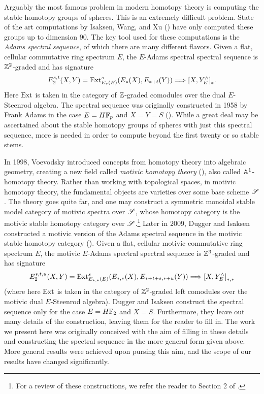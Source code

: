 \documentclass[../main.tex]{subfiles}
\begin{document}
Arguably the most famous problem in modern homotopy theory is computing the stable homotopy groups of spheres. This is an extremely difficult problem. State of the art computations by Isaksen, Wang, and Xu (\cite{isaksen2023stable}) have only computed these groups up to dimension $90$. The key tool used for these computations is the \emph{Adams spectral sequence}, of which there are many different flavors. Given a flat, cellular commutative ring spectrum $E$, the $E$-Adams spectral spectral sequence is $\mathbb{Z}^2$-graded and has signature
\[E_2^{s,t}(X,Y)=\mathrm{Ext}_{E_*(E)}^{s}(E_*(X),E_{*+t}(Y))\Longrightarrow {[X,Y_E^\wedge]}_*.\]
Here $\mathrm{Ext}$ is taken in the category of $\mathbb{Z}$-graded comodules over the dual $E$-Steenrod algebra. The spectral sequence was originally constructed in 1958 by Frank Adams in the case $E=H\mathbb{F}_p$ and $X=Y=S$ (\cite{Adams1958}). While a great deal may be ascertained about the stable homotopy groups of spheres with just this spectral sequence, more is needed in order to compute beyond the first twenty or so stable stems.

In 1998, Voevodsky introduced concepts from homotopy theory into algebraic geometry, creating a new field called \emph{motivic homotopy theory} (\cite{voevodsky1998a1}), also called $\mathbb A^1$-homotopy theory. Rather than working with topological spaces, in motivic homotopy theory, the fundamental objects are varieties over some base scheme $\mathscr{S}$. The theory goes quite far, and one may construct a symmetric monoidal stable model category of motivic spectra over $\mathscr{S}$, whose homotopy category is the motivic stable homotopy category over $\mathscr{S}$.\footnote{For a review of these constructions, we refer the reader to Section 2 of \cite{WilOst}.} Later in 2009, Dugger and Isaksen constructed a motivic version of the Adams spectral sequence in the motivic stable homotopy category (\cite{DugIsak}). Given a flat, cellular motivic commutative ring spectrum $E$, the motivic $E$-Adams spectral spectral sequence is $\mathbb{Z}^3$-graded and has signature
\[E_2^{s,t,u}(X,Y)=\mathrm{Ext}^s_{E_{*,*}(E)}(E_{*,*}(X),E_{*+t+s,*+u}(Y))\Longrightarrow{[X,Y^\wedge_E]}_{*,*}\]
(where here $\mathrm{Ext}$ is taken in the category of $\mathbb{Z}^2$-graded left comodules over the motivic dual $E$-Steenrod algebra). Dugger and Isaksen construct the spectral sequence only for the case $E=H\mathbb{F}_2$ and $X=S$. Furthermore, they leave out many details of the construction, leaving them for the reader to fill in. The work we present here was originally conceived with the aim of filling in these details and constructing the spectral sequence in the more general form given above. More general results were achieved upon pursing this aim, and the scope of our results have changed significantly.
\end{document}
